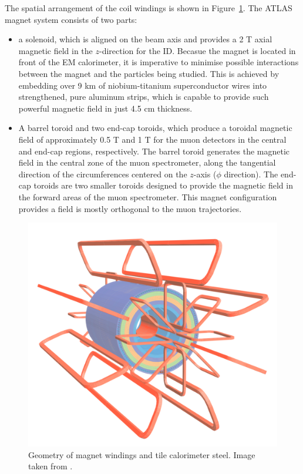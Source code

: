 The spatial arrangement of the coil windings is shown in 
Figure~\ref{fig:ATLAS_magnets}. 
The ATLAS magnet system consists of two parts:
\begin{itemize}
	\item a solenoid, which is aligned on the beam axis and 
	provides a 2 T axial magnetic field in the $z$-direction
	for the ID. Becasue the magnet is located in front
	of the EM calorimeter, it is imperative to minimise possible interactions
	between the magnet and the particles being studied.
	This is achieved by embedding over 9 km of niobium-titanium 
	superconductor wires into strengthened, pure aluminum strips, 
	which is capable to provide such powerful magnetic field
	in just 4.5 cm thickness. 
	\item  A barrel toroid and two end-cap toroids, 
	which produce a	toroidal magnetic field of approximately 
	0.5 T and 1 T for the muon detectors in the central 
	and end-cap regions, respectively. 
	The barrel toroid generates the magnetic field in the central zone 
	of the muon spectrometer, along the tangential direction of 
	the circumferences centered on the $z$-axis ($\phi$ direction). 
	The end-cap toroids are two smaller toroids designed to 
	provide the magnetic field in the forward areas of 
	the muon spectrometer. 
	This magnet configuration provides a field is mostly orthogonal 
	to the muon trajectories. 
	
\end{itemize}		



\begin{figure}[bht]
	\begin{centering}	
	\includegraphics[width=.56\textwidth]{Detector/plots/ATLAS magnets.png}
	\caption{Geometry of magnet windings and
	tile calorimeter steel. Image taken from \cite{PERF-2007-01}.}
	\label{fig:ATLAS_magnets}
	\end{centering}
\end{figure}


